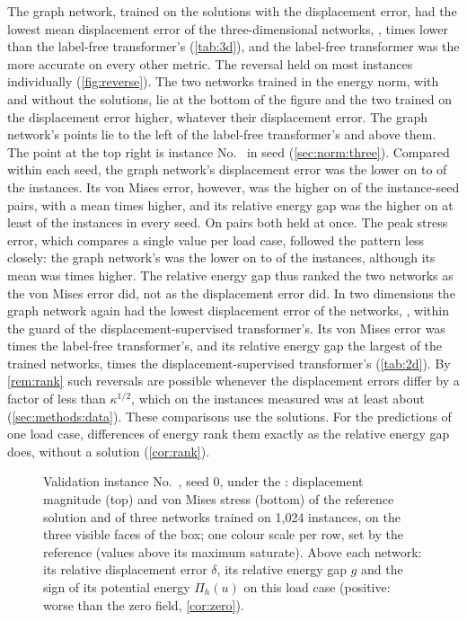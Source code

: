 The graph network, trained on the solutions with the displacement error, had the lowest mean
displacement error of the three-dimensional networks, \numThreeMgnDisp{},
\numThreeFreeOverMgnDisp{} times lower than the label-free transformer's (\cref{tab:3d}),
and the label-free transformer was the more accurate on every other metric. The reversal held on most instances individually (\cref{fig:reverse}). The two networks
trained in the energy norm, with and without the solutions, lie at the bottom of the figure
and the two trained on the displacement error higher, whatever their displacement error. The
graph network's points lie to the left of the label-free transformer's and above them. The
point at the top right is instance No.~\numWorstIndex{} in seed \numThreeLabWorstSeed{}
(\cref{sec:norm:three}). Compared within each seed, the
graph network's displacement error was the lower on \numMgnDispLowerMin{} to \numMgnDispLowerMax{} of the instances. Its von
Mises error, however, was the higher on
\numMgnVmHigher{} of the \numThreePairs{} instance-seed pairs, with a mean
\numThreeMgnOverFreeVm{} times higher, and its relative energy gap was the higher on at
least \numMgnGapHigherMin{} of the instances in every seed. On \numMgnLowerDispHigherVm{}
pairs both held at once. The peak stress error, which compares a single value per load case,
followed the pattern less closely: the graph network's was the lower on
\numMgnPeakLowerMin{} to \numMgnPeakLowerMax{} of the instances, although its mean was
\numThreeMgnOverFreePeak{} times higher. The relative energy gap thus ranked the two
networks as the von Mises error did, not as the displacement error did. In two dimensions
the graph network again had the lowest displacement error of the networks, \numCmMgnDisp{},
within the guard of the displacement-supervised transformer's. Its von Mises error was
\numCmMgnOverFreeVm{} times the label-free transformer's, and its relative energy gap the
largest of the trained networks, \numCmMgnOverLabGap{} times the displacement-supervised
transformer's (\cref{tab:2d}). By \cref{rem:rank} such reversals are possible whenever the
displacement errors differ by a factor of less than $\kappa^{1/2}$, which on the instances
measured was at least about \numSqrtKappaMin{} (\cref{sec:methods:data}). These comparisons use the solutions. For the predictions of one load case, differences of energy rank them
exactly as the relative energy gap does, without a solution (\cref{cor:rank}).

\begin{figure}[tbp]
\centering
{}
\caption{Validation instance No.~\numWorstIndex{}, seed 0, under the \numFigWorstLoad{}:
displacement magnitude (top) and von Mises stress (bottom) of the reference solution and of
three networks trained on 1,024 instances, on the three visible faces of the box; one colour
scale per row, set by the reference (values above its maximum saturate). Above each
network: its relative displacement error $\delta$, its relative energy gap $g$ and the sign
of its potential energy $\Pi_h(u)$ on this load case (positive: worse than the zero field,
\cref{cor:zero}).}
\label{fig:field-worst}
\end{figure}

